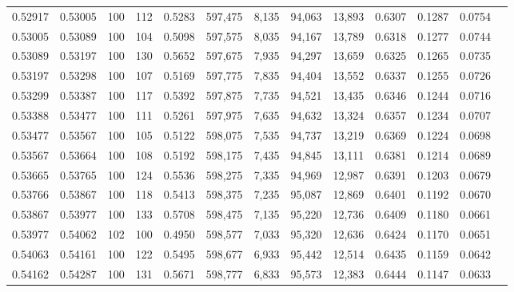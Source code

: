 \begin{tabular}{rrrrrrrrrrrrr}
0.52917 & 0.53005 &   100 & 112 &                                     0.5283 & 597,475 &   8,135 &  94,063 &  13,893 & 0.6307 & 0.1287 & 0.0754 \\
0.53005 & 0.53089 &   100 & 104 &                                     0.5098 & 597,575 &   8,035 &  94,167 &  13,789 & 0.6318 & 0.1277 & 0.0744 \\
0.53089 & 0.53197 &   100 & 130 &                                     0.5652 & 597,675 &   7,935 &  94,297 &  13,659 & 0.6325 & 0.1265 & 0.0735 \\
0.53197 & 0.53298 &   100 & 107 &                                     0.5169 & 597,775 &   7,835 &  94,404 &  13,552 & 0.6337 & 0.1255 & 0.0726 \\
0.53299 & 0.53387 &   100 & 117 &                                     0.5392 & 597,875 &   7,735 &  94,521 &  13,435 & 0.6346 & 0.1244 & 0.0716 \\
0.53388 & 0.53477 &   100 & 111 &                                     0.5261 & 597,975 &   7,635 &  94,632 &  13,324 & 0.6357 & 0.1234 & 0.0707 \\
0.53477 & 0.53567 &   100 & 105 &                                     0.5122 & 598,075 &   7,535 &  94,737 &  13,219 & 0.6369 & 0.1224 & 0.0698 \\
0.53567 & 0.53664 &   100 & 108 &                                     0.5192 & 598,175 &   7,435 &  94,845 &  13,111 & 0.6381 & 0.1214 & 0.0689 \\
0.53665 & 0.53765 &   100 & 124 &                                     0.5536 & 598,275 &   7,335 &  94,969 &  12,987 & 0.6391 & 0.1203 & 0.0679 \\
0.53766 & 0.53867 &   100 & 118 &                                     0.5413 & 598,375 &   7,235 &  95,087 &  12,869 & 0.6401 & 0.1192 & 0.0670 \\
0.53867 & 0.53977 &   100 & 133 &                                     0.5708 & 598,475 &   7,135 &  95,220 &  12,736 & 0.6409 & 0.1180 & 0.0661 \\
0.53977 & 0.54062 &   102 & 100 &                                     0.4950 & 598,577 &   7,033 &  95,320 &  12,636 & 0.6424 & 0.1170 & 0.0651 \\
0.54063 & 0.54161 &   100 & 122 &                                     0.5495 & 598,677 &   6,933 &  95,442 &  12,514 & 0.6435 & 0.1159 & 0.0642 \\
0.54162 & 0.54287 &   100 & 131 &                                     0.5671 & 598,777 &   6,833 &  95,573 &  12,383 & 0.6444 & 0.1147 & 0.0633 \\

\end{tabular}
